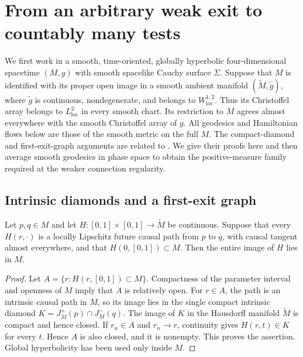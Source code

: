 \section{From an arbitrary weak exit to countably many tests}
\label{ex:section}

We first work in a smooth, time-oriented, globally hyperbolic
four-dimensional spacetime $(M,g)$ with smooth spacelike Cauchy
surface $\Sigma$.  Suppose that $M$ is identified with its proper
open image in a smooth ambient manifold $(\widetilde M,\widetilde g)$,
where $\widetilde g$ is continuous, nondegenerate, and belongs to
$W^{1,2}_{\mathrm{loc}}$.  Thus its Christoffel array belongs to
$L^2_{\mathrm{loc}}$ in every smooth chart.  Its restriction to $M$
agrees almost everywhere with the smooth Christoffel array of $g$.
All geodesics and Hamiltonian flows below are those of the smooth
metric on the full $M$.
The compact-diamond and first-exit-graph arguments are related to
\cite[Proposition~2.6 and Lemma~2.12]{Sbierski2022}. We give their
proofs here and then average smooth geodesics in phase space to obtain
the positive-measure family required at the weaker connection regularity.

\subsection{Intrinsic diamonds and a first-exit graph}

\begin{lemma}
\label{ex:homotopy}
Let $p,q\in M$ and let
$H:[0,1]\times[0,1]\longrightarrow\widetilde M$ be continuous.
Suppose that every $H(r,\cdot)$ is a locally Lipschitz future causal
path from $p$ to $q$, with causal tangent almost everywhere, and that
$H(0,[0,1])\subset M$. Then the entire image of $H$
lies in $M$.
\end{lemma}

\begin{proof}
Let $A=\{r:H(r,[0,1])\subset M\}$.  Compactness of the parameter
interval and openness of $M$ imply that $A$ is relatively open.
For $r\in A$, the path is an intrinsic causal path in $M$, so its
image lies in the single compact intrinsic diamond
$K=J_M^+(p)\cap J_M^-(q)$.  The image of $K$ in the Hausdorff
manifold $\widetilde M$ is compact and hence closed.  If
$r_n\in A$ and $r_n\to r$, continuity gives
$H(r,t)\in K$ for every $t$.  Hence $A$ is also closed, and it is
nonempty.  This proves the assertion.  Global hyperbolicity has
been used only inside $M$.
\end{proof}

